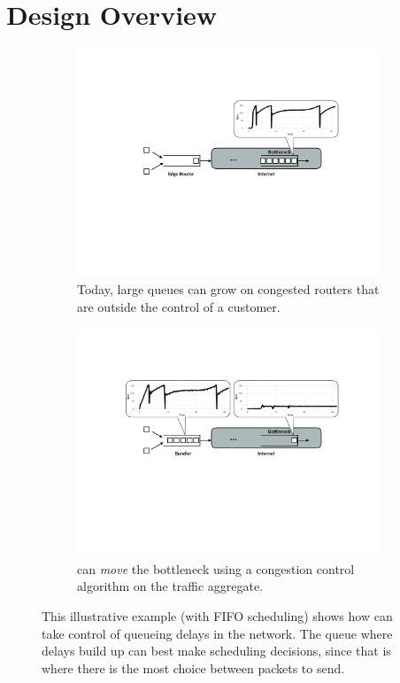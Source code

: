 \section{Design Overview}\label{s:design}
\begin{figure}
    \centering
    \begin{subfigure}[b]{0.5\textwidth}
        \includegraphics[width=\textwidth]{img/shift-bottleneck-before}
        \caption{Today, large queues can grow on congested routers that are outside the control of a customer.}\label{fig:design:shift-bottleneck:before}
    \end{subfigure}
    \begin{subfigure}[b]{0.5\textwidth}
        \includegraphics[width=\textwidth]{img/shift-bottleneck-after}
        \caption{\name can \emph{move} the bottleneck using a congestion control algorithm on the traffic aggregate.}\label{fig:design:shift-bottleneck:after}
    \end{subfigure}
    \caption{This illustrative example (with FIFO scheduling) shows how \name can take control of queueing delays in the network. The queue where delays build up can best make scheduling decisions, since that is where there is the most choice between packets to send.}\label{fig:design:shift-bottleneck}
\end{figure}

